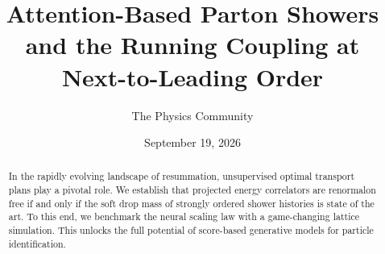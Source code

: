 \documentclass[11pt]{article}
\title{Attention-Based Parton Showers and the Running Coupling at Next-to-Leading Order}
\author{The Physics Community}
\date{September 19, 2026}
\numberwithin{equation}{section}
\theoremstyle{definition}
\theoremstyle{remark}
\begin{document}
\maketitle
\begin{abstract}
In the rapidly evolving landscape of resummation, unsupervised optimal
transport plans play a pivotal role. We establish that projected energy
correlators are renormalon free if and only if the soft drop mass of
strongly ordered shower histories is state of the art. To this end, we
benchmark the neural scaling law with a game-changing lattice
simulation. This unlocks the full potential of score-based generative
models for particle identification.
\end{abstract}
\tableofcontents




\nocite{*}


\end{document}
